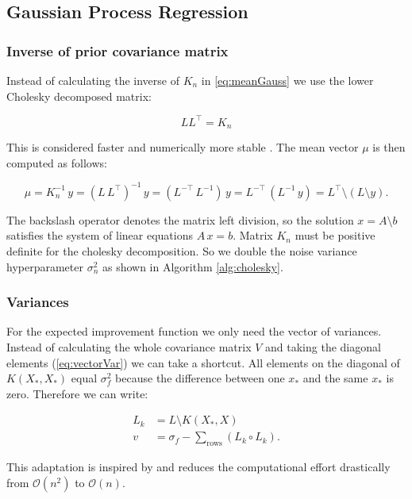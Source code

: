 \subsection{Gaussian Process Regression}

\subsubsection{Inverse of prior covariance matrix}

Instead of calculating the inverse of $K_n$ in \eqref{eq:meanGauss} we use the lower Cholesky decomposed matrix:

$$LL^\top=K_n$$

This is considered faster and numerically more stable \cite{rasmussen2006gaussian}. The mean vector $\mu$ is then computed as follows:

\begin{equation} \label{eq:regression}
    \mu = K_n^{-1}\,y = (L\,L^{\top})^{-1}\,y = (L^{-\top}\,L^{-1})\,y = L^{-\top}\,(L^{-1}\,y) = L^{\top}\setminus(L \setminus y).
\end{equation}

The backslash operator denotes the matrix left division, so the solution $x=A\setminus b$ satisfies the system of linear equations $A\,x=b$.
Matrix $K_n$ must be positive definite for the cholesky decomposition. So we double the noise variance hyperparameter $\sigma_n^2$ as shown in Algorithm \ref{alg:cholesky}.

\subsubsection{Variances}

For the expected improvement function we only need the vector of variances. Instead of calculating the whole covariance matrix $V$ and taking the diagonal elements (\ref{eq:vectorVar}) we can take a shortcut. All elements on the diagonal of $K(X_*,X_*)$ equal $\sigma_f^2$ because the difference between one $x_*$ and the same $x_*$ is zero. Therefore we can write:

\begin{align}
    L_k &= L \setminus K(X_*,X) \\
    v &= \sigma_f - \sum_{\text{rows}} (L_k \circ L_k). \label{eq:vectorvar}
\end{align}

This adaptation is inspired by \cite{nandoCode} and reduces the computational effort drastically from $\mathcal{O}(n^2)$ to $\mathcal{O}(n)$.

